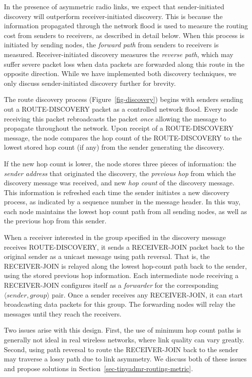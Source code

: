 In the presence of asymmetric radio links, we expect that
sender-initiated discovery will outperform receiver-initiated
discovery. This is because the information propagated through
the network flood is used to measure the routing cost from
senders to receivers, as described in detail below. When this 
process is initiated by sending nodes, the {\em forward path} 
from senders to receivers is measured. Receiver-initiated discovery
measures the {\em reverse path}, which may suffer severe packet 
loss when data packets are forwarded along this route in the 
opposite direction. While we have implemented both discovery
techniques, we only discuss sender-initiated discovery further for brevity.

The route discovery process (Figure~\ref{fig-discovery})
begins with senders sending out a ROUTE-DISCOVERY
packet as a controlled network flood. Every node receiving 
this packet rebroadcasts the packet {\em once} allowing the
message to propagate throughout the network. Upon receipt of
a ROUTE-DISCOVERY message, the node compares the
hop count of the ROUTE-DISCOVERY to the lowest stored
hop count (if any) from the sender generating the discovery. 

If the new hop count is lower, the node stores three
pieces of information: the {\em sender address} that originated the
discovery, the {\em previous hop} from which the discovery message
was received, and new {\em hop count} of the discovery message.
This information is refreshed each time the sender initiates a 
new discovery process, as indicated by a sequence number in 
the message header. In this way, each node maintains the lowest hop 
count path from all sending nodes, as well as the previous hop from 
this sender. 

When a receiver interested in the group specified in the discovery
message receives ROUTE-DISCOVERY, it
sends a RECEIVER-JOIN packet back to the original sender
as a unicast message using path reversal. That is, the
RECEIVER-JOIN is relayed along the lowest hop-count path back to 
the sender, using the stored previous hop information. 
Each intermediate node receiving a RECEIVER-JOIN
configures itself as a {\em forwarder} for the corresponding
$\langle \mathit{sender},\mathit{group} \rangle$ pair.
Once a sender receives any RECEIVER-JOIN, it can start
broadcasting data packets for this group. The forwarding nodes
will relay the messages until they reach the receivers.

Two issues arise with this design. First, the use of
minimum hop count paths is generally not ideal in real wireless
networks, where link quality can vary greatly. Second, using path
reversal to route the RECEIVER-JOIN back to the sender may traverse
a lossy path due to link asymmetry. We discuss both of these issues
and propose solutions in Section~\ref{sec-tinyadmr-routing-metric}.

